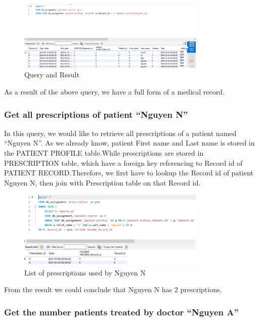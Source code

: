 \begin{figure}[H]
  \centering
  \includegraphics[width=0.8\textwidth]{assets/query_1a.png}
  \captionsetup{justification=centering,margin=2cm}
  \caption{Query and Result}
\end{figure}

As a result of the above query, we have a full form of a medical record.

\subsubsection{Get all prescriptions of patient ``Nguyen N'' }
In this query, we would like to retrieve all prescriptions of a patient named ``Nguyen N''.
As we already know, patient First name and Last name is stored in the PATIENT PROFILE table.While prescriptions are stored in PRESCRIPTION table, which have a foreign key referencing to Record id of PATIENT RECORD.Therefore, we first have to lookup the Record id of patient Nguyen N, then join with Prescription table on that Record id.

\begin{figure}[H]
  \centering
  \includegraphics[width=0.8\textwidth]{assets/query_2.png}
  \captionsetup{justification=centering,margin=2cm}
  \caption{List of prescriptions used by Nguyen N}
\end{figure}

From the result we could conclude that Nguyen N has 2 prescriptions.

\subsubsection{Get the number patients treated by doctor ``Nguyen A''}

